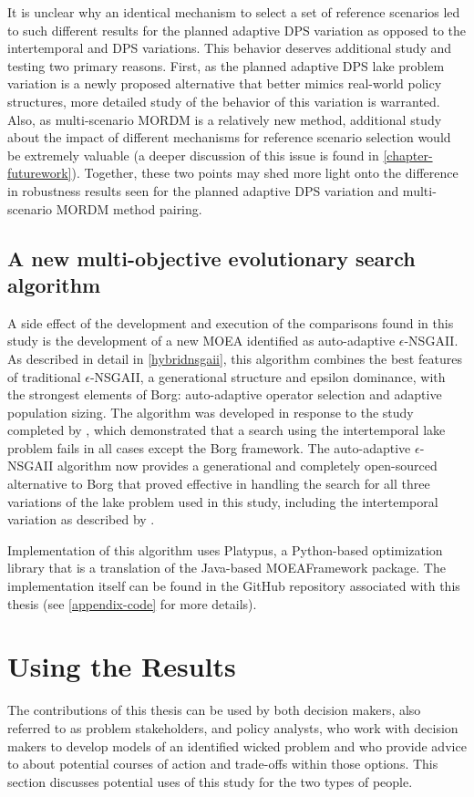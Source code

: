     It is unclear why an identical mechanism to select a set of reference scenarios led to such different results for the planned adaptive DPS variation as opposed to the intertemporal and DPS variations. This behavior deserves additional study and testing two primary reasons. First, as the planned adaptive DPS lake problem variation is a newly proposed alternative that better mimics real-world policy structures, more detailed study of the behavior of this variation is warranted. Also, as multi-scenario MORDM is a relatively new method, additional study about the impact of different mechanisms for reference scenario selection would be extremely valuable (a deeper discussion of this issue is found in \cref{chapter-futurework}). Together, these two points may shed more light onto the difference in robustness results seen for the planned adaptive DPS variation and multi-scenario MORDM method pairing.
    
    \subsection{A new multi-objective evolutionary search algorithm}
    A side effect of the development and execution of the comparisons found in this study is the development of a new MOEA identified as auto-adaptive $\epsilon$-NSGAII. As described in detail in \cref{hybridnsgaii}, this algorithm combines the best features of traditional $\epsilon$-NSGAII, a generational structure and epsilon dominance, with the strongest elements of Borg: auto-adaptive operator selection and adaptive population sizing. The algorithm was developed in response to the study completed by \citet{Ward2015}, which demonstrated that a search using the intertemporal lake problem fails in all cases except the Borg framework. The auto-adaptive  $\epsilon$-NSGAII algorithm now provides a generational and completely open-sourced alternative to Borg that proved effective in handling the search for all three variations of the lake problem used in this study, including the intertemporal variation as described by \citet{Ward2015}. 
    
    Implementation of this algorithm uses Platypus, a Python-based optimization library that is a translation of the Java-based MOEAFramework package. The implementation itself can be found in the GitHub repository associated with this thesis (see \cref{appendix-code} for more details).

\section{Using the Results}\label{reflect-application}
The contributions of this thesis can be used by both decision makers, also referred to as problem stakeholders, and policy analysts, who work with decision makers to develop models of an identified wicked problem and who provide advice to about potential courses of action and trade-offs within those options. This section discusses potential uses of this study for the two types of people. 

